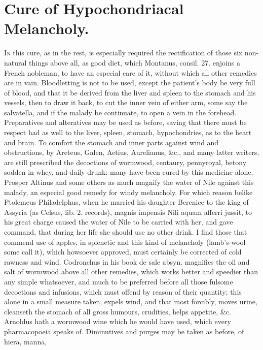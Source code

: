 \section{Cure of Hypochondriacal Melancholy.}

\lettrine{I}{n} this cure, as in the rest, is especially required the rectification
of those six non-natural things above all, as good diet, which
Montanus, consil. 27. enjoins a French nobleman, to have an especial
care of it, without which all other remedies are in vain. Bloodletting
is not to be used, except the patient's body be very full of blood, and
that it be derived from the liver and spleen to the stomach and his
vessels, then to draw it back, to cut the inner vein of either
arm, some say the salvatella, and if the malady be continuate, to
open a vein in the forehead.
Preparatives and alteratives may be used as before, saving that there
must be respect had as well to the liver, spleen, stomach,
hypochondries, as to the heart and brain. To comfort the stomach
and inner parts against wind and obstructions, by Areteus, Galen,
Aetius, Aurelianus, \&c., and many latter writers, are still prescribed
the decoctions of wormwood, centaury, pennyroyal, betony sodden in
whey, and daily drunk: many have been cured by this medicine alone.
Prosper Altinus and some others as much magnify the water of Nile
against this malady, an especial good remedy for windy melancholy. For
which reason belike Ptolemeus Philadelphus, when he married his
daughter Berenice to the king of Assyria (as Celsus, lib. 2. records),
magnis impensis Nili aquam afferri jussit, to his great charge caused
the water of Nile to be carried with her, and gave command, that during
her life she should use no other drink. I find those that commend use
of apples, in splenetic and this kind of melancholy (lamb's-wool some
call it), which howsoever approved, must certainly be corrected of cold
rawness and wind.
Codronchus in his book de sale absyn. magnifies the oil and salt of
wormwood above all other remedies, which works better and
speedier than any simple whatsoever, and much to be preferred before
all those fulsome decoctions and infusions, which must offend by reason
of their quantity; this alone in a small measure taken, expels wind,
and that most forcibly, moves urine, cleanseth the stomach of all gross
humours, crudities, helps appetite, \&c. Arnoldus hath a wormwood wine
which he would have used, which every pharmacopoeia speaks of.
Diminutives and purges may be taken as before, of hiera, manna,
